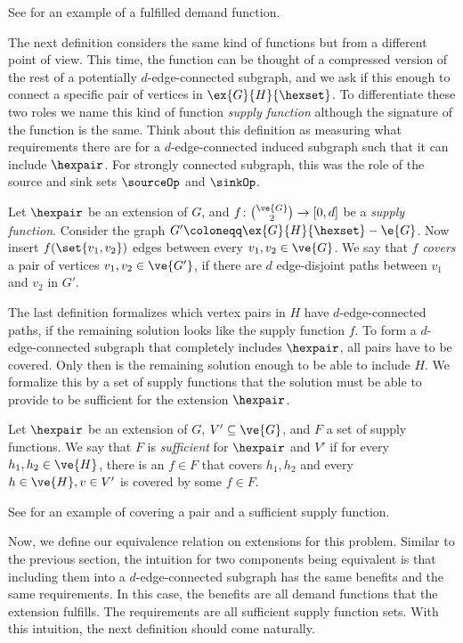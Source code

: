 See  for an example of a fulfilled demand function.

The next definition considers the same kind of functions but from a different point of view. This time, the function can be thought of a compressed version of the rest of a potentially $d$-edge-connected subgraph, and we ask if this enough to connect a specific pair of vertices in $\ex{G}{H}{\hexset}$. To differentiate these two roles we name this kind of function \emph{supply function} although the signature of the function is the same. Think about this definition as measuring what requirements there are for a $d$-edge-connected induced subgraph such that it can include $\hexpair$. For strongly connected subgraph, this was the role of the source and sink sets $\sourceOp$ and $\sinkOp$.

\begin{definition}
  Let $\hexpair$ be an extension of $G$, and $f \colon \binom{\ve{G}}{2} \to [0,d]$ be a \emph{supply function}. Consider the graph $G' \coloneqq \ex{G}{H}{\hexset} - \e{G}$. Now insert $f(\set{v_1, v_2})$ edges between every $v_1, v_2 \in \ve{G}$. We say that $f$ \emph{covers} a pair of vertices $v_1, v_2 \in \ve{G'}$, if there are $d$ edge-disjoint paths between $v_1$ and $v_2$ in $G'$.
\end{definition}

The last definition formalizes which vertex pairs in $H$ have $d$-edge-connected paths, if the remaining solution looks like the supply function $f$.
To form a $d$-edge-connected subgraph that completely includes $\hexpair$, all pairs have to be covered. Only then is the remaining solution enough to be able to include $H$. We formalize this by a set of supply functions that the solution must be able to provide to be sufficient for the extension $\hexpair$.

\begin{definition}[Sufficiency]
  Let $\hexpair$ be an extension of $G$, $V' \subseteq \ve{G}$, and $F$ a set of supply functions. We say that $F$ is \emph{sufficient} for $\hexpair$ and $V'$ if for every $h_1, h_2 \in \ve{H}$, there is an $f \in F$ that covers $h_1, h_2$ and every $h\in \ve{H}, v \in V'$ is covered by some $f \in F$.
\end{definition}

See  for an example of covering a pair and a sufficient supply function.

Now, we define our equivalence relation on extensions for this problem. Similar to the previous section, the intuition for two components being equivalent is that including them into a $d$-edge-connected subgraph has the same benefits and the same requirements. In this case, the benefits are all demand functions that the extension fulfills. The requirements are all sufficient supply function sets. With this intuition, the next definition should come naturally.

